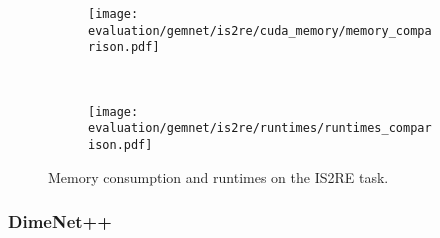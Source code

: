 \begin{figure}[H]
    \centering

    \begin{subfigure}[t]{0.48\textwidth}
        \centering
        \texttt{[image: evaluation/gemnet/is2re/cuda\_memory/memory\_comparison.pdf]}
        \label{fig:gemnet-is2re-memory-results}
    \end{subfigure}%
    ~
    \begin{subfigure}[t]{0.48\textwidth}
        \centering
        \texttt{[image: evaluation/gemnet/is2re/runtimes/runtimes\_comparison.pdf]}
        \label{gemnet-is2re-runtimes-results}
    \end{subfigure}
    \vspace*{-1.5em}
    \caption{Memory consumption and runtimes on the IS2RE task.}
    
\end{figure}

\subsubsection{DimeNet++}
